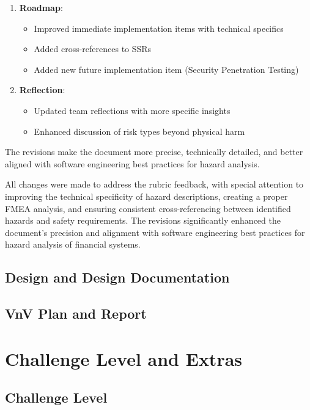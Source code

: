 \documentclass{article}
\begin{document}
\begin{enumerate}
  \item \textbf{Roadmap}:
  \begin{itemize}
    \item Improved immediate implementation items with technical specifics
    \item Added cross-references to SSRs
    \item Added new future implementation item (Security Penetration Testing)
  \end{itemize}

  \item \textbf{Reflection}:
  \begin{itemize}
    \item Updated team reflections with more specific insights
    \item Enhanced discussion of risk types beyond physical harm
  \end{itemize}
\end{enumerate}

\vspace{1em}
The revisions make the document more precise, technically detailed, and better aligned with software engineering best practices for hazard analysis.


All changes were made to address the rubric feedback, with special attention to improving the technical specificity of hazard descriptions, creating a proper FMEA analysis, and ensuring consistent cross-referencing between identified hazards and safety requirements. The revisions significantly enhanced the document's precision and alignment with software engineering best practices for hazard analysis of financial systems.

\subsection{Design and Design Documentation}

\subsection{VnV Plan and Report}

\section{Challenge Level and Extras}

\subsection{Challenge Level}
\end{document}
